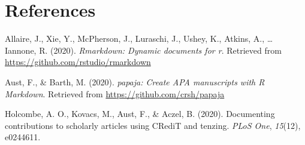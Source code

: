 \documentclass[
  ,jou,floatsintext]{apa6}
\newlength{\cslhangindent}
\newlength{\cslentryspacingunit} %
\newenvironment{CSLReferences}[2] %
 {%
  \setlength{\parindent}{0pt}
  \ifodd #1
  \let\oldpar\par
  \def\par{\hangindent=\cslhangindent\oldpar}
  \fi
  \setlength{\parskip}{#2\cslentryspacingunit}
 }%
 {}
\begin{document}
\hypertarget{references}{%
\section*{References}\label{references}}

\hypertarget{refs}{}
\begin{CSLReferences}{1}{0}
\leavevmode{}%
Allaire, J., Xie, Y., McPherson, J., Luraschi, J., Ushey, K., Atkins, A., \ldots{} Iannone, R. (2020). \emph{Rmarkdown: Dynamic documents for r}. Retrieved from \url{https://github.com/rstudio/rmarkdown}

\leavevmode{}%
Aust, F., \& Barth, M. (2020). \emph{{papaja}: {Create} {APA} manuscripts with {R Markdown}}. Retrieved from \url{https://github.com/crsh/papaja}

\leavevmode{}%
Holcombe, A. O., Kovacs, M., Aust, F., \& Aczel, B. (2020). Documenting contributions to scholarly articles using CRediT and tenzing. \emph{PLoS One}, \emph{15}(12), e0244611.

\end{CSLReferences}
\end{document}
